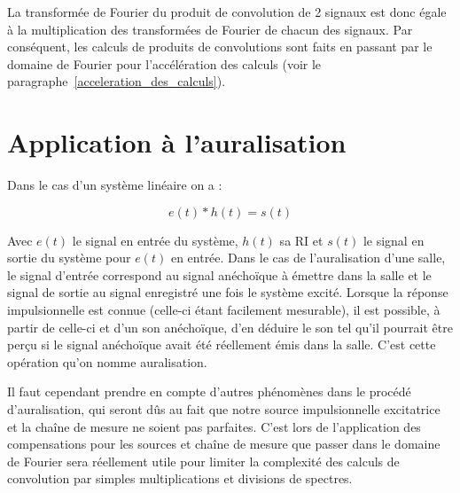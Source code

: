 La transformée de Fourier du produit de convolution de 2 signaux est donc égale à la multiplication des transformées de Fourier de chacun des signaux.
Par conséquent, les calculs de produits de convolutions sont faits en passant par le domaine de Fourier pour
l'accélération des calculs (voir le paragraphe~\ref{acceleration_des_calculs}).


\section{Application à l'auralisation} %

Dans le cas d'un système linéaire on a :

\begin{equation}
e(t) \ast h(t) = s(t)
\end{equation}

Avec $e(t)$ le signal en entrée du système, $h(t)$ sa RI et $s(t)$ le signal en sortie du système pour $e(t)$ en entrée.
Dans le cas de l'auralisation d'une salle, le signal d'entrée correspond au signal anéchoïque à émettre dans la salle et le signal de sortie au signal enregistré une fois le système excité.
Lorsque la réponse impulsionnelle est connue (celle-ci étant facilement mesurable), il est possible, à partir de celle-ci et d'un son anéchoïque, d'en déduire le son tel qu'il pourrait être perçu si le signal anéchoïque avait été réellement émis dans la salle. C'est cette opération qu'on nomme auralisation.


Il faut cependant prendre en compte d'autres phénomènes dans le procédé d'auralisation, qui seront dûs au fait que notre source impulsionnelle excitatrice et la chaîne de mesure ne soient pas parfaites.
C'est lors de l'application des compensations pour les sources et chaîne de mesure que passer dans le domaine de Fourier
sera réellement utile pour limiter la complexité des calculs de convolution par simples multiplications et divisions de spectres.
